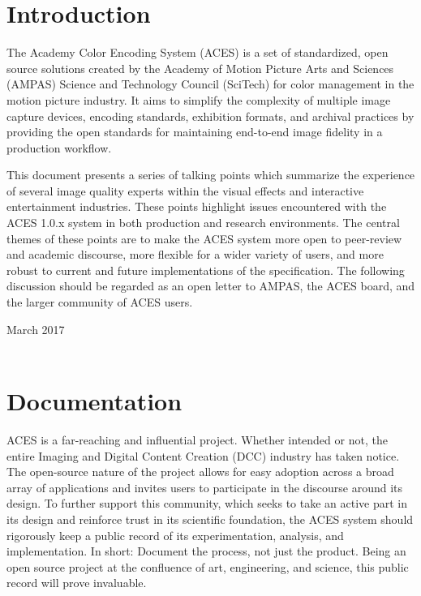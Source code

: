 \documentclass[conference]{IEEEtran}
\begin{document}
\section{Introduction}
The Academy Color Encoding System (ACES) is a set of standardized, open source solutions created by the Academy of Motion Picture Arts and Sciences (AMPAS) Science and Technology Council (SciTech) for color management in the motion picture industry. It aims to simplify the complexity of multiple image capture devices, encoding standards, exhibition formats, and archival practices by providing the open standards for maintaining end-to-end image fidelity in a production workflow.

This document presents a series of talking points which summarize the experience of several image quality experts within the visual effects and interactive entertainment industries. These points highlight issues encountered with the ACES 1.0.x system in both production and research environments. The central themes of these points are to make the ACES system more open to peer-review and academic discourse, more flexible for a wider variety of users, and more robust to current and future implementations of the specification. The following discussion should be regarded as an open letter to AMPAS, the ACES board, and the larger community of ACES users.

\hfill March 2017
\\
\\

\section{Documentation}
ACES is a far-reaching and influential project. Whether intended or not, the entire Imaging and Digital Content Creation (DCC) industry has taken notice. The open-source nature of the project allows for easy adoption across a broad array of applications and invites users to participate in the discourse around its design. To further support this community, which seeks to take an active part in its design and reinforce trust in its scientific foundation, the ACES system should rigorously keep a public record of its experimentation, analysis, and implementation. In short: Document the process, not just the product. Being an open source project at the confluence of art, engineering, and science, this public record will prove invaluable.
\end{document}
